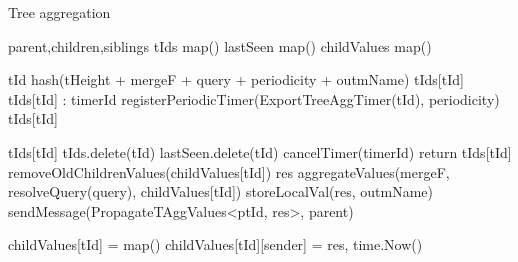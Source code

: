 \begin{algorithm}
\caption{Tree aggregation} \label{alg:mon:tree_agg}
\begin{algorithmic}[1]

    \asdstate \label{alg:mon:tree_agg:state}
        \State parent,children,siblings 
        \State tIds \asdassign map()
        \State lastSeen \asdassign map()
        \State childValues \asdassign map()
    \asdend

    \label{alg:mon:tree_agg:start_req}
        \State tId \asdassign hash(tHeight + mergeF + query + periodicity + outmName) \label{alg:mon:tree_agg:start_req_start}
            \State <tHeight, mergeF, query, periodicity, outmName, timerId, isLocal, isParentSub, ptId> \asdassign tIds[tId]
            \State tIds[tId] \asdassign <tHeight, mergeF, query, periodicity, outmName, timerId, true, isParentSub, ptId>
        \Else:
        \State timerId \asdassign registerPeriodicTimer(ExportTreeAggTimer(tId), periodicity)
        \State tIds[tId] \asdassign <tHeight, mergeF, query, periodicity, outmName, timerId, true, false, nil>
        \EndIf\label{alg:mon:tree_agg:start_req_end}
    \asdend

     \label{alg:mon:tree_agg:export_trigger}
        \State <tHeight, mergeF, query, periodicity, outmName, timerId, isLocal, isParentSub, ptId> \asdassign tIds[tId]
                \State tIds.delete(tId)
                \State lastSeen.delete(tId)
                \State cancelTimer(timerId)
                \State return
            \Else
                \State tIds[tId] \asdassign <tHeight, mergeF, query, periodicity, outmName, timerId, isLocal, false, nil>
            \EndIf
        \EndIf
        \State removeOldChildrenValues(childValues[tId])
        \State res \asdassign aggregateValues(mergeF, resolveQuery(query), childValues[tId])
            \State storeLocalVal(res, outmName)
        \EndIf 
            \State sendMessage(PropagateTAggValues<ptId, res>, parent)
        \EndIf
    \asdend

     \label{alg:mon:tree_agg:recv_propag_vals}
                \State childValues[tId] = map()
            \EndIf
            \State childValues[tId][sender] = res, time.Now()
        \EndIf
    \asdend


\end{algorithmic}
\end{algorithm}

